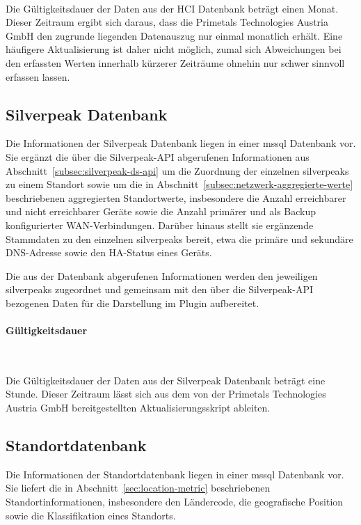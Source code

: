 ~

Die Gültigkeitsdauer der Daten aus der HCI Datenbank beträgt einen Monat.
Dieser Zeitraum ergibt sich daraus, dass die Primetals Technologies Austria
GmbH den zugrunde liegenden Datenauszug nur einmal monatlich erhält. Eine
häufigere Aktualisierung ist daher nicht möglich, zumal sich Abweichungen bei
den erfassten Werten innerhalb kürzerer Zeiträume ohnehin nur schwer sinnvoll
erfassen lassen.

\subsection{Silverpeak Datenbank}
\label{subsec:silverpeak-db}

Die Informationen der Silverpeak Datenbank liegen in einer \gls{mssql} Datenbank vor.
Sie ergänzt die über die Silverpeak-API abgerufenen Informationen aus
Abschnitt~\ref{subsec:silverpeak-ds-api} um die Zuordnung der einzelnen
\glspl{silverpeak} zu einem Standort sowie um die in
Abschnitt~\ref{subsec:netzwerk-aggregierte-werte} beschriebenen aggregierten
Standortwerte, insbesondere die Anzahl erreichbarer und nicht erreichbarer
Geräte sowie die Anzahl primärer und als Backup konfigurierter
WAN-Verbindungen. Darüber hinaus stellt sie ergänzende Stammdaten zu den
einzelnen \glspl{silverpeak} bereit, etwa die primäre und sekundäre
DNS-Adresse sowie den HA-Status eines Geräts.

Die aus der Datenbank abgerufenen Informationen werden den jeweiligen
\glspl{silverpeak} zugeordnet und gemeinsam mit den über die Silverpeak-API
bezogenen Daten für die Darstellung im Plugin aufbereitet.

\paragraph{Gültigkeitsdauer}
\label{par:silverpeak-db-validation-time}

~

Die Gültigkeitsdauer der Daten aus der Silverpeak Datenbank beträgt
eine Stunde. Dieser Zeitraum lässt sich aus dem von der Primetals
Technologies Austria GmbH bereitgestellten Aktualisierungsskript ableiten.

\subsection{Standortdatenbank}
\label{subsec:location-db}

Die Informationen der Standortdatenbank liegen in einer \gls{mssql} Datenbank vor.
Sie liefert die in Abschnitt~\ref{sec:location-metric} beschriebenen
Standortinformationen, insbesondere den Ländercode, die geografische Position
sowie die Klassifikation eines Standorts.

